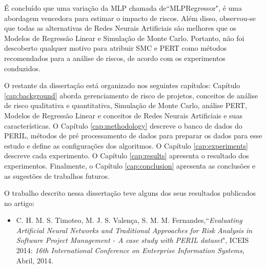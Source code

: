 É concluído que uma variação da MLP chamada de``MLPRegressor", é uma abordagem vencedora para estimar o impacto de riscos. Além disso, observou-se que todas as alternativas de Redes Neurais Artificiais são melhores que os Modelos de Regressão Linear e Simulação de Monte Carlo. Portanto, não foi descoberto qualquer motivo para atribuir SMC e PERT como métodos recomendados para a análise de riscos, de acordo com os experimentos conduzidos.

O restante da dissertação está organizado nos seguintes capítulos: Capítulo \ref{cap:background} aborda gerenciamento de risco de projetos, conceitos de análise de risco qualitativa e quantitativa, Simulação de Monte Carlo, análise PERT, Modelos de Regressão Linear e conceitos de Redes Neurais Artificiais e suas características. O Capítulo \ref{cap:methodology} descreve o banco de dados do PERIL, métodos de pré processamento de dados para preparar os dados para esse estudo e define as configurações dos algoritmos. O Capítulo \ref{cap:experiments} descreve cada experimento. O Capítulo \ref{cap:results} apresenta o resultado dos experimentos. Finalmente, o Capítulo \ref{cap:conclusion} apresenta as conclusões e as sugestões de trabalhos futuros.

O trabalho descrito nessa dissertação teve alguns dos seus resultados publicados no artigo:
\begin{itemize}
\item C. H. M. S. Timoteo, M. J. S. Valença, S. M. M. Fernandes,``\textit{Evaluating Artificial Neural Networks and Traditional Approaches for Risk Analysis in Software Project Management - A case study with PERIL dataset}", ICEIS 2014: \textit{16th International Conference on Enterprise Information Systems}, Abril, 2014.
\end{itemize}

